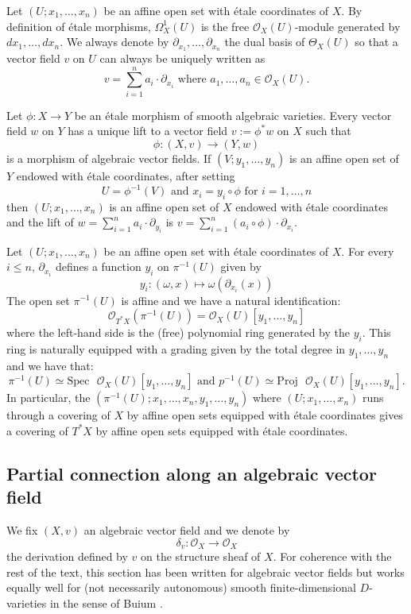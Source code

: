 \documentclass[12pt]{amsart}
\newcommand{\Spec}{\rm{Spec}}
\renewcommand{\O}{\mathcal{O}}
\theoremstyle{definition}
\theoremstyle{plain}
\theoremstyle{exampstyle}
\theoremstyle{exampstyle}\newtheorem{thmxbis}{Theorem}
\numberwithin{equation}{section}
\theoremstyle{remark}
\renewcommand{\Spec}{\mathrm{Spec}}
\begin{document}
Let $(U;x_1,\ldots, x_n)$ be an affine open set with étale coordinates of $X$. By definition of étale morphisms, $\Omega^1_X(U)$ is the free $\O_X(U)$-module generated by $dx_1, \ldots, dx_n$. We always denote by $\partial_{x_1}, \ldots, \partial_{x_n}$ the dual basis of $\Theta_X(U)$ so that a vector field $v$ on $U$ can always be uniquely written as  
$$v = \sum_{i = 1}^n a_i \cdot \partial_{x_i} \text{ where } a_1,\ldots, a_n \in \mathcal O_X(U).$$
 

 \label{example-lift} Let $\phi: X \rightarrow Y$ be an étale morphism of smooth algebraic varieties. Every vector field $w$ on $Y$ has a unique lift to a vector field $v := \phi^\ast w$ on $X$ such that 
$$\phi: (X,v) \rightarrow (Y,w)$$
is a morphism of algebraic vector fields. If $(V; y_1,\ldots, y_n)$ is an affine open set of $Y$ endowed with étale coordinates, after setting $$U = \phi^{-1}(V) \text{ and } x_i = y_i \circ \phi \text{ for } i = 1,\ldots, n$$ then $(U; x_1,\ldots, x_n)$ is an affine open set of $X$ endowed with étale coordinates and the lift of 
$w = \sum_{i = 1}^n a_i \cdot \partial_{y_i}$ is 
$v = \sum_{i = 1}^n (a_i \circ \phi) \cdot \partial_{x_i}$.


 Let $(U;x_1,\ldots, x_n)$ be an affine open set with étale coordinates of $X$.
 For every $i \leq n$, $\partial_{x_i}$ defines a function $y_i$ on $\pi^{-1}(U)$ given by  
$$ y_i: (\omega, x) \mapsto \omega(\partial_{x_i}(x))$$
The open set $\pi^{-1}(U)$ is affine and we have a natural identification:  
$$\mathcal O_{T^\ast X}(\pi^{-1}(U)) = \mathcal O_X(U)[y_1, \ldots , y_n]$$
where the left-hand side is the (free) polynomial ring generated by the $y_i$. This ring is naturally equipped with a grading given by the total degree in $y_1,\ldots, y_n$ and we have that: 
$$\pi^{-1}(U) \simeq \Spec \text{ } \mathcal O_X(U)[y_1, \ldots , y_n] \text{ and } p^{-1}(U) \simeq \mathrm{Proj} \text{ } \mathcal O_X(U)[y_1, \ldots , y_n].$$
In particular, the $(\pi^{-1}(U); x_1,\ldots, x_n, y_1, \ldots, y_n)$ where $(U;x_1,\ldots, x_n)$ runs through a covering of $X$ by affine open sets equipped with étale coordinates gives a covering of $T^\ast X$ by affine open sets equipped with étale coordinates. 




\subsection{Partial connection along an algebraic vector field} \label{section-differential structure} We fix $(X,v)$ an algebraic vector field and we denote by 
$$\delta_v : \mathcal O_X \rightarrow \mathcal O_X$$
the derivation defined by $v$ on the structure sheaf of $X$. For coherence with the rest of the text, this section has been written for algebraic vector fields but works equally well for (not necessarily autonomous) smooth finite-dimensional $D$-varieties in the sense of Buium \cite{Buium}.  
\end{document}
